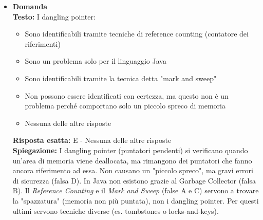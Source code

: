 \documentclass[12pt, a4paper]{article}
\newcounter{domandateoria}
\begin{document}
\begin{itemize}
    \item {}\textbf{Domanda \thedomandateoria} \\
    \textbf{Testo:} I dangling pointer:
    \begin{itemize}
        \item[A)] Sono identificabili tramite tecniche di reference counting (contatore dei riferimenti)
        \item[B)] Sono un problema solo per il linguaggio Java
        \item[C)] Sono identificabili tramite la tecnica detta "mark and sweep"
        \item[D)] Non possono essere identificati con certezza, ma questo non è un problema perché comportano solo un piccolo spreco di memoria
        \item[E)] Nessuna delle altre risposte
    \end{itemize}
    \textbf{Risposta esatta:} E - Nessuna delle altre risposte \\
    \textbf{Spiegazione:} I dangling pointer (puntatori pendenti) si verificano quando un'area di memoria viene deallocata, ma rimangono dei puntatori che fanno ancora riferimento ad essa. Non causano un "piccolo spreco", ma gravi errori di sicurezza (falsa D). In Java non esistono grazie al Garbage Collector (falsa B). Il \textit{Reference Counting} e il \textit{Mark and Sweep} (false A e C) servono a trovare la "spazzatura" (memoria non più puntata), non i dangling pointer. Per questi ultimi servono tecniche diverse (es. tombstones o locks-and-keys).
    \vspace{0.3cm}

\newpage


\end{itemize}
\end{document}
